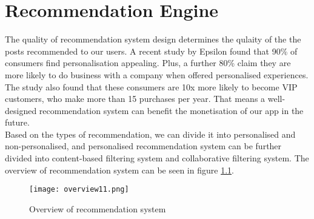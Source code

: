 
\chapter{Recommendation Engine}%
\label{Chapter6} %


The quality of recommendation system design determines the qulaity of the the posts recommended to our users. 
A recent study by Epsilon found that 90\% of consumers find personalisation appealing. Plus, a further 80\% claim they are more likely to do business with a company when offered personalised experiences.
The study also found that these consumers are 10x more likely to become VIP customers, who make more than 15 purchases per year. 
That means a well-designed recommendation system can benefit the monetisation of our app in the future.
\\Based on the types of recommendation, we can divide it into personalised and non-personalised, and personalised recommendation system can be further divided into content-based filtering system and collaborative filtering system. 
The overview of recommendation system can be seen in figure \ref{fig:overrecomm}.
\begin{figure}[ht]
\centering
\texttt{[image: overview11.png]}
\caption{Overview of recommendation system}
\label{fig:overrecomm}
\end{figure}

